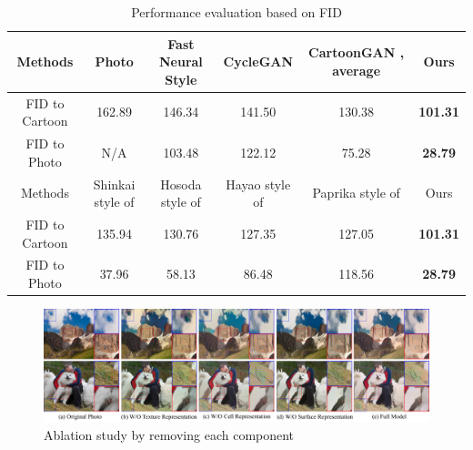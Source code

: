 \documentclass[10pt,twocolumn,letterpaper]{article}
\begin{document}
\begin{table}[t]
\centering
\begin{tabular}{cccccc}
\hline
{Methods}&{Photo}&{Fast Neural Style \cite{johnson2016perceptual}}&{CycleGAN \cite{CycleGAN2017}}&{CartoonGAN \cite{chen2018cartoongan}, average}&{Ours}\\
\hline  
{FID to Cartoon}&{162.89}&{146.34}&{141.50}&{130.38}&{\textbf{101.31}}\\
{FID to Photo}&{N/A}&{103.48}&{122.12}&{75.28}&{\textbf{28.79}}\\
\hline 
{Methods}&{Shinkai style of \cite{chen2018cartoongan}}
&{Hosoda style of \cite{chen2018cartoongan}}
&{Hayao style of \cite{chen2018cartoongan}}
&{Paprika style of \cite{chen2018cartoongan}}&{Ours}\\
\hline  
{FID to Cartoon}&{135.94}&{130.76}&{127.35}&{127.05}&{\textbf{101.31}}\\
{FID to Photo}&{37.96}&{58.13}&{86.48}&{118.56}&{\textbf{28.79}}\\
\hline 
\end{tabular}
\caption{Performance evaluation based on FID}\label{table:table1}
\vspace{-1em}
\end{table}

\begin{figure}[htb]
\centering
\includegraphics[width=\linewidth]{imgs/ablation_study.pdf}
\caption{Ablation study by removing each component}
\label{fig:figure7}
\vspace{-1em}
\end{figure}

\vspace{-0.3em}
\end{document}

